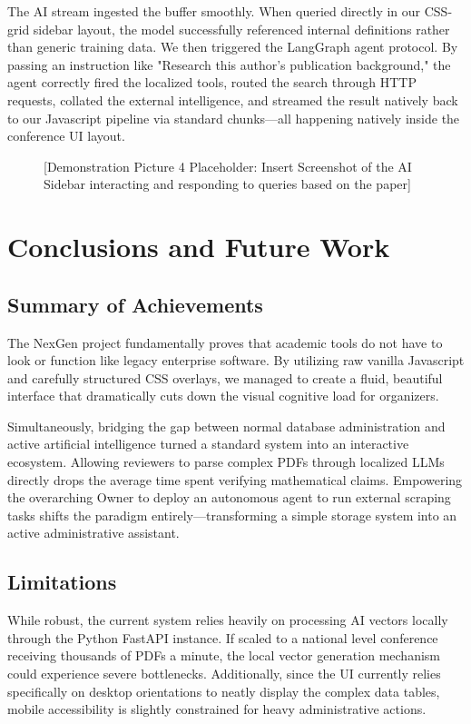 \documentclass[12pt,a4paper]{report}
\begin{document}
The AI stream ingested the buffer smoothly. When queried directly in our CSS-grid sidebar layout, the model successfully referenced internal definitions rather than generic training data. We then triggered the LangGraph agent protocol. By passing an instruction like "Research this author's publication background," the agent correctly fired the localized tools, routed the search through HTTP requests, collated the external intelligence, and streamed the result natively back to our Javascript pipeline via standard chunks—all happening natively inside the conference UI layout.

\begin{figure}[htbp]
    \centering
    \vspace{5cm}
    \caption{[Demonstration Picture 4 Placeholder: Insert Screenshot of the AI Sidebar interacting and responding to queries based on the paper]}
    \label{fig:aisidebar}
\end{figure}

\chapter{Conclusions and Future Work}

\section{Summary of Achievements}
The NexGen project fundamentally proves that academic tools do not have to look or function like legacy enterprise software. By utilizing raw vanilla Javascript and carefully structured CSS overlays, we managed to create a fluid, beautiful interface that dramatically cuts down the visual cognitive load for organizers.

Simultaneously, bridging the gap between normal database administration and active artificial intelligence turned a standard system into an interactive ecosystem. Allowing reviewers to parse complex PDFs through localized LLMs directly drops the average time spent verifying mathematical claims. Empowering the overarching Owner to deploy an autonomous agent to run external scraping tasks shifts the paradigm entirely—transforming a simple storage system into an active administrative assistant.

\section{Limitations}
While robust, the current system relies heavily on processing AI vectors locally through the Python FastAPI instance. If scaled to a national level conference receiving thousands of PDFs a minute, the local vector generation mechanism could experience severe bottlenecks. Additionally, since the UI currently relies specifically on desktop orientations to neatly display the complex data tables, mobile accessibility is slightly constrained for heavy administrative actions.
\end{document}
